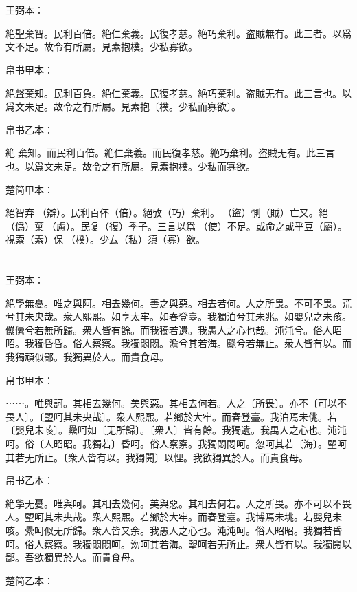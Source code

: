 \documentclass[a5paper]{ctexbook}
\begin{document}
    \chapter{}
    王弼本：

    絶聖棄智。民利百倍。絶仁棄義。民復孝慈。絶巧棄利。盗賊無有。此三者。以爲文不足。故令有所屬。見素抱樸。少私寡欲。

    
    帛书甲本：

    絶聲棄知。民利百負。絶仁棄義。民復孝慈。絶巧棄利。盗賊无有。此三言也。以爲文未足。故令之有所屬。見素抱〔樸。少私而寡欲〕。

    帛书乙本：

    絶𦔻棄知。而民利百倍。絶仁棄義。而民復孝慈。絶巧棄利。盗賊无有。此三言也。以爲文未足。故令之有所屬。見素抱樸。少私而寡欲。

    楚简甲本：

    絕智弃󶴉（辯）。民利百伓（倍）。絕攷（巧）棄利。󶴊（盜）惻（賊）亡又。絕𢠿（僞）棄󶴍（慮）。民复（復）季子。三言以爲󶴎（使）不足。或命之或乎豆（屬）。視索（素）保󶴏（樸）。少厶（私）須（寡）欲。

    \chapter{}
    王弼本：

    絶學無憂。唯之與阿。相去幾何。善之與惡。相去若何。人之所畏。不可不畏。荒兮其未央哉。衆人熙熙。如享太牢。如春登臺。我獨泊兮其未兆。如嬰兒之未孩。儽儽兮若無所歸。衆人皆有餘。而我獨若遺。我愚人之心也哉。沌沌兮。俗人昭昭。我獨昏昏。俗人察察。我獨悶悶。澹兮其若海。飂兮若無止。衆人皆有以。而我獨頑似鄙。我獨異於人。而貴食母。

    
    帛书甲本：

    ⋯⋯。唯與訶。其相去幾何。美與惡。其相去何若。人之〔所畏〕。亦不〔可以不畏人〕。〔朢呵其未央哉〕。衆人熙熙。若鄉於大牢。而春登臺。我泊焉未佻。若〔嬰兒未咳〕。纍呵如〔无所歸〕。〔衆人〕皆有餘。我獨遺。我禺人之心也。沌沌呵。俗〔人昭昭。我獨若〕昏呵。俗人察察。我獨悶悶呵。忽呵其若〔海〕。朢呵其若无所止。〔衆人皆有以。我獨䦎〕以悝。我欲獨異於人。而貴食母。

    帛书乙本：

    絶學无憂。唯與呵。其相去幾何。美與惡。其相去何若。人之所畏。亦不可以不畏人。朢呵其未央哉。衆人熙熙。若鄉於大牢。而春登臺。我博焉未垗。若嬰兒未咳。纍呵似无所歸。衆人皆又余。我愚人之心也。沌沌呵。俗人昭昭。我獨若昏呵。俗人察察。我獨悶悶呵。沕呵其若海。朢呵若无所止。衆人皆有以。我獨䦎以鄙。吾欲獨異於人。而貴食母。

    楚简乙本：
\end{document}

